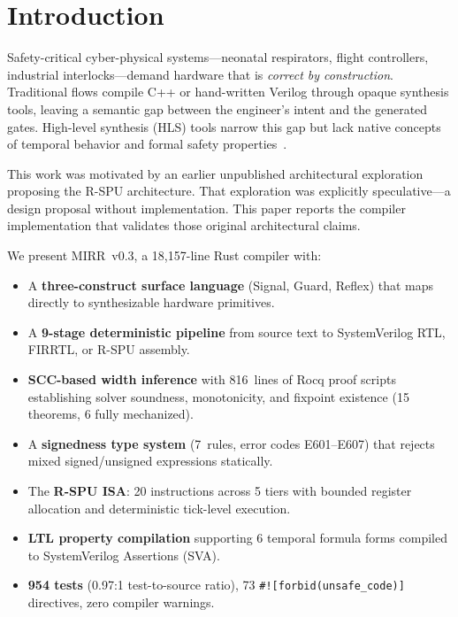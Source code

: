 \documentclass[conference]{IEEEtran}
\begin{document}
\section{Introduction}

Safety-critical cyber-physical systems---neonatal respirators, flight
controllers, industrial interlocks---demand hardware that is
\emph{correct by construction}.  Traditional flows compile C++ or
hand-written Verilog through opaque synthesis tools, leaving a semantic
gap between the engineer's intent and the generated gates.
High-level synthesis (HLS) tools narrow this gap but lack native concepts
of temporal behavior and formal safety properties~\cite{nane2016hls}.

This work was motivated by an earlier unpublished architectural
exploration proposing the R-SPU architecture.  That exploration was
explicitly speculative---a design proposal without implementation.
This paper reports the compiler implementation that validates those
original architectural claims.

We present MIRR~v0.3, a 18,157-line Rust compiler with:

\begin{itemize}
\item A \textbf{three-construct surface language} (Signal, Guard, Reflex)
      that maps directly to synthesizable hardware primitives.
\item A \textbf{9-stage deterministic pipeline} from source text to
      SystemVerilog RTL, FIRRTL, or R-SPU assembly.
\item \textbf{SCC-based width inference} with 816~lines of Rocq proof
      scripts establishing solver soundness, monotonicity, and fixpoint
      existence (15 theorems, 6 fully mechanized).
\item A \textbf{signedness type system} (7~rules, error codes E601--E607)
      that rejects mixed signed/unsigned expressions statically.
\item The \textbf{R-SPU ISA}: 20 instructions across 5 tiers with
      bounded register allocation and deterministic tick-level execution.
\item \textbf{LTL property compilation} supporting 6 temporal formula
      forms compiled to SystemVerilog Assertions (SVA).
\item \textbf{954 tests} (0.97:1 test-to-source ratio), 73
      \texttt{\#![forbid(unsafe\_code)]} directives, zero compiler
      warnings.
\end{itemize}
\end{document}
